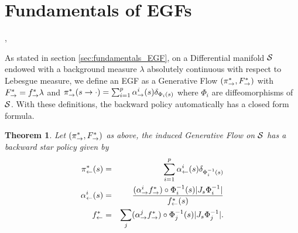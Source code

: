\documentclass{article}
\theoremstyle{plain}
\newtheorem{theorem}{Theorem}[section]
\theoremstyle{definition}
\theoremstyle{remark}
\theoremstyle{fact}
\begin{document}
\section{Fundamentals of EGFs} \label{sec:appendix_backward},

As stated in section \ref{sec:fundamentals_EGF}, on a Differential manifold $\mathcal S$ endowed with a background measure $\lambda$ absolutely continuous with respect to Lebesgue measure, we define an EGF as a Generative Flow  $(\pi_{\rightarrow}^*, F^*_{\rightarrow})$ with 
$F^*_{\rightarrow} = f^*_{\rightarrow} \lambda$ and $\pi_{\rightarrow}^*(s\rightarrow \cdot) = \sum_{i=1}^p\alpha_{\rightarrow}^{i}(s)\delta_{\Phi_i(s)}$ where $\Phi_i$ are diffeomorphisms of $\mathcal S$.  With these definitions, the backward policy automatically has a closed form formula.
\begin{theorem}\label{theo:backward_policy} Let $(\pi_{\rightarrow}^*,F^*_{\rightarrow})$ as above, the induced Generative Flow  on $\mathcal S$ has a backward star policy given by  
    \begin{eqnarray}\label{equ:tractable_inflow_appendix}
\pi_{\leftarrow}^*(s) &=& \sum_{i=1}^p\alpha_{\leftarrow}^i(s) \delta_{\Phi_i^{-1}(s)} \\ 
\alpha_{\leftarrow}^i(s) &=& \frac{(\alpha_{\rightarrow}^if^*_\rightarrow)\circ \Phi_i^{-1}(s)|J_s {\Phi_i^{-1}}| }{ f^*_{\leftarrow}(s)} \\
f^*_{\leftarrow} &=&  \sum_j (\alpha_{\rightarrow}^jf^*_\rightarrow)\circ \Phi_j^{-1}(s) |J_s {\Phi_j^{-1}}|.
\end{eqnarray}
\end{theorem}
\end{document}
